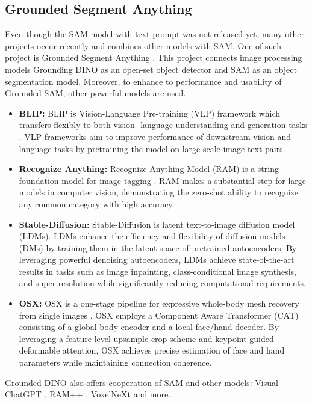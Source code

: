 \subsection{Grounded Segment Anything}
Even though the SAM model with text prompt was not released yet, many other projects occur recently and combines
other models with SAM. One of such project is Grounded Segment Anything \cite{ren2024grounded}. This project connects
image processing models Grounding DINO \cite{liu2023grounding} as an open-set object detector and SAM \cite{SAM2023} as 
an object segmentation model. Moreover, to enhance to performance and usability of Grounded SAM, other powerful 
models are used.
\begin{itemize}
  \item \textbf{BLIP:} BLIP is Vision-Language Pre-training (VLP) framework which transfers flexibly to both vision
  -language understanding and generation tasks \cite{li2022blip}. VLP frameworks aim to improve performance of
  downstream vision and language tasks by pretraining the model on large-scale image-text pairs.
  \item \textbf{Recognize Anything:} Recognize Anything Model (RAM) is a string foundation model for image tagging \cite{zhang2023recognize}. RAM makes
  a substantial step for large models in computer vision,
  demonstrating the zero-shot ability to recognize any common category with high accuracy.
  \item \textbf{Stable-Diffusion:} Stable-Diffusion is latent text-to-image diffusion model (LDMs)\cite{
    rombach2022highresolution}. LDMs enhance the efficiency and flexibility of diffusion models (DMs) by training them in the latent space of pretrained autoencoders. By leveraging powerful denoising autoencoders, LDMs achieve state-of-the-art results in tasks such as image inpainting, class-conditional image synthesis, and super-resolution while significantly reducing computational requirements.
  \item \textbf{OSX:} OSX is a one-stage pipeline for expressive whole-body mesh recovery from single images \cite{
    OSX2023}. OSX employs a Component Aware Transformer (CAT) consisting of a global body encoder and a local face/hand decoder. By leveraging a feature-level upsample-crop scheme and keypoint-guided deformable attention, OSX achieves precise estimation of face and hand parameters while maintaining connection coherence.
\end{itemize}
Grounded DINO also offers cooperation of SAM and other models: Visual ChatGPT \cite{wu2023visual}, RAM++ \cite{
  huang2023openset}, VoxelNeXt \cite{chen2023voxelnext} and more.
